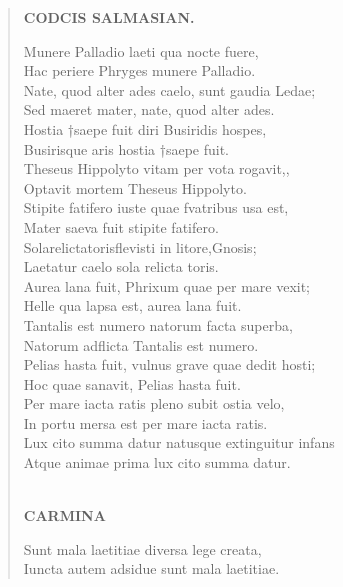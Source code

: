 \documentclass[11pt, a4paper]{report}
\begin{document}
\begin{verse}
    \begin{center} \textbf{CODCIS SALMASIAN.} \end{center} \marginpar{[193]} Munere Palladio laeti qua nocte fuere, \\ Hac periere Phryges munere Palladio. \\ Nate, quod alter ades caelo, sunt gaudia Ledae; \\ Sed maeret mater, nate, quod alter ades. \\ Hostia †saepe fuit diri Busiridis hospes, \\ Busirisque aris hostia †saepe fuit. \\ Theseus Hippolyto vitam per vota rogavit,, \\ Optavit mortem Theseus Hippolyto. \\ Stipite fatifero iuste quae fvatribus usa est, \\ Mater saeva fuit stipite fatifero. \\ Solarelictatorisflevisti \lbrack in \rbrack litore,Gnosis; \\ Laetatur caelo sola relicta toris. \\ Aurea lana fuit, Phrixum quae per mare vexit; \\ Helle qua lapsa est, aurea lana fuit. \\ Tantalis est numero natorum facta superba, \\ Natorum adflicta Tantalis est numero. \\ Pelias hasta fuit, vulnus grave quae dedit hosti; \\ Hoc quae sanavit, Pelias hasta fuit. \\ Per mare iacta ratis pleno subit ostia velo, \\ In portu mersa est per mare iacta ratis. \\ Lux cito summa datur natusque extinguitur infans \\ Atque animae prima lux cito summa datur. \\ 
        ﻿\pagebreak 
    \begin{center} \textbf{CARMINA} \end{center} \marginpar{[194]} Sunt mala laetitiae diversa lege creata, \\ Iuncta autem adsidue sunt mala laetitiae. \\ 
      \end{verse}
  
\end{document}

